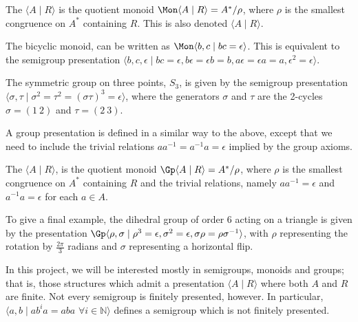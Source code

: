 \documentclass[noindex,noinsetproof,emphthm,12pt]{lmaths}
\begin{document}
\begin{defn}
	The  $\langle A \mid R\rangle$ is the quotient monoid $\Mon \langle A \mid R\rangle = A^*/\rho$, where $\rho$ is the smallest congruence on $A^*$ containing $R$. This is also denoted $\langle A \mid R \rangle$.
\end{defn}

\begin{example}
The bicyclic monoid, can be written as $\Mon \langle b, c \mid bc = \epsilon \rangle$. This is equivalent to the semigroup presentation $\langle b, c, \epsilon \mid bc = \epsilon, b\epsilon = \epsilon b = b, a\epsilon = \epsilon a = a, \epsilon^2 = \epsilon \rangle$.
\end{example}

\begin{example}
	The symmetric group on three points, $S_3$, is given by the semigroup presentation $\langle \sigma, \tau \mid \sigma^2 = \tau^2 = (\sigma\tau)^3 = \epsilon \rangle$, where the generators $\sigma$ and $\tau$ are the 2-cycles $\sigma = (1\ 2)$ and $\tau = (2\ 3)$.
\end{example}

A group presentation is defined in a similar way to the above, except that we need to include the trivial relations $aa^{-1} = a^{-1}a = \epsilon$ implied by the group axioms.

\begin{defn}
	The  $\langle A \mid R\rangle$, is the quotient monoid $\Gp \langle A \mid R\rangle = A^*/\rho$, where $\rho$ is the smallest congruence on $A^*$ containing $R$ and the trivial relations, namely $aa^{-1} = \epsilon$ and $a^{-1}a = \epsilon$ for each $a \in A$.
\end{defn}

To give a final example, the dihedral group of order 6 acting on a triangle is given by the presentation $\Gp \langle \rho, \sigma \mid \rho^3 = \epsilon, \sigma^2 = \epsilon, \sigma\rho = \rho\sigma^{-1} \rangle$, with $\rho$ representing the rotation by $\frac{2\pi}{3}$ radians and $\sigma$ representing a horizontal flip.

In this project, we will be interested mostly in  semigroups, monoids and groups; that is, those structures which admit a presentation $\langle A \mid R\rangle$ where both $A$ and $R$ are finite. Not every semigroup is finitely presented, however. In particular, $\langle a, b \mid ab^ia = aba \,\,\forall i \in \mathbb{N} \rangle$ defines a semigroup which is not finitely presented.
\end{document}
